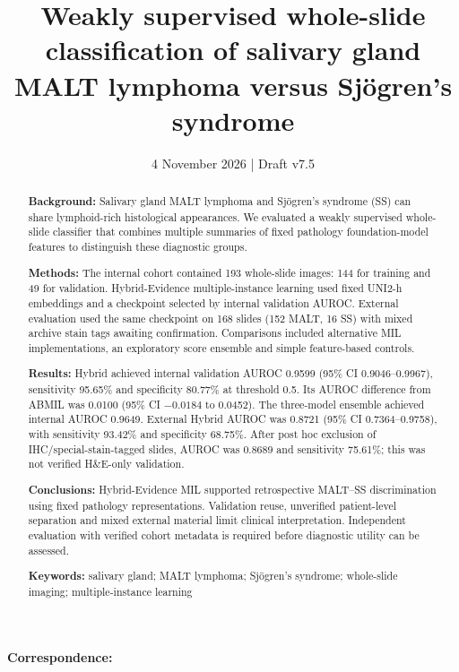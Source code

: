 \title{Weakly supervised whole-slide classification of salivary gland MALT lymphoma versus Sjögren's syndrome}
\author{}
\date{4 November 2026 \quad | \quad Draft v7.5}
\maketitle
\textbf{Correspondence:} 

\begin{abstract}
\textbf{Background:} Salivary gland MALT lymphoma and Sjögren's syndrome (SS) can share lymphoid-rich histological appearances. We evaluated a weakly supervised whole-slide classifier that combines multiple summaries of fixed pathology foundation-model features to distinguish these diagnostic groups.

\textbf{Methods:} The internal cohort contained 193 whole-slide images: 144 for training and 49 for validation. Hybrid-Evidence multiple-instance learning used fixed UNI2-h embeddings and a checkpoint selected by internal validation AUROC. External evaluation used the same checkpoint on 168 slides (152 MALT, 16 SS) with mixed archive stain tags awaiting confirmation. Comparisons included alternative MIL implementations, an exploratory score ensemble and simple feature-based controls.

\textbf{Results:} Hybrid achieved internal validation AUROC 0.9599 (95\% CI 0.9046--0.9967), sensitivity 95.65\% and specificity 80.77\% at threshold 0.5. Its AUROC difference from ABMIL was 0.0100 (95\% CI $-0.0184$ to 0.0452). The three-model ensemble achieved internal AUROC 0.9649. External Hybrid AUROC was 0.8721 (95\% CI 0.7364--0.9758), with sensitivity 93.42\% and specificity 68.75\%. After post hoc exclusion of IHC/special-stain-tagged slides, AUROC was 0.8689 and sensitivity 75.61\%; this was not verified H\&E-only validation.

\textbf{Conclusions:} Hybrid-Evidence MIL supported retrospective MALT--SS discrimination using fixed pathology representations. Validation reuse, unverified patient-level separation and mixed external material limit clinical interpretation. Independent evaluation with verified cohort metadata is required before diagnostic utility can be assessed.

\textbf{Keywords:} salivary gland; MALT lymphoma; Sjögren's syndrome; whole-slide imaging; multiple-instance learning
\end{abstract}
